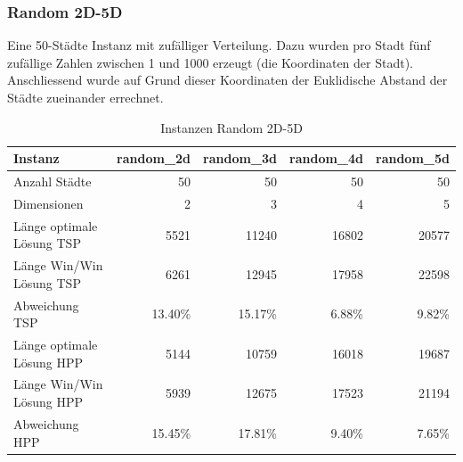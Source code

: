 \documentclass[11pt,a4paper]{article}
\begin{document}
\subsubsection{Random 2D-5D}
Eine 50-Städte Instanz mit zufälliger Verteilung. Dazu wurden pro Stadt fünf zufällige Zahlen zwischen 1 und 1000 erzeugt (die Koordinaten der Stadt). Anschliessend wurde auf Grund dieser Koordinaten der Euklidische Abstand der Städte zueinander errechnet.

\begin{table}[H]
        \centering
        \begin{tabular}{| l | r | r | r | r |}
            \hline
            Instanz                     & \textbf{random\_2d}
                                        & \textbf{random\_3d}
                                        & \textbf{random\_4d}
                                        & \textbf{random\_5d} \\ \hline
            Anzahl Städte               & 50        & 50        & 50        & 50            \\ \hline
            Dimensionen                 & 2         & 3         & 4         & 5       \\ \hline
            Länge optimale Lösung TSP   & 5521      & 11240     & 16802     & 20577   \\ \hline
            Länge Win/Win Lösung  TSP   & 6261      & 12945     & 17958     & 22598   \\ \hline
            Abweichung TSP              & 13.40\%   & 15.17\%   & 6.88\%    & 9.82\%  \\ \hline
            Länge optimale Lösung HPP   & 5144      & 10759     & 16018     & 19687   \\ \hline
            Länge Win/Win Lösung  HPP   & 5939      & 12675     & 17523     & 21194   \\ \hline
            Abweichung HPP              & 15.45\%   & 17.81\%   & 9.40\%    & 7.65\%  \\ \hline
        \end{tabular}
        \caption{Instanzen Random 2D-5D}
        \label{tab:instanzen_random}
\end{table}
\end{document}
